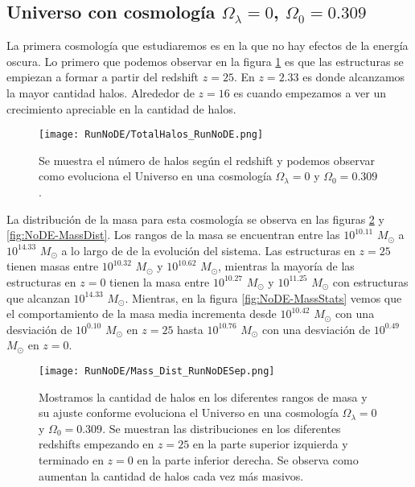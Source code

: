 
\subsection{Universo con cosmología \texorpdfstring{$\Omega_\lambda = 0$, $\Omega_0 = 0.309$ }{Omega lambda = 0, Omega 0 = 0.309}  }

La primera cosmología que estudiaremos es en la que no hay efectos de la energía oscura. Lo primero que podemos observar en la figura \ref{fig:NoDE_TotalHalos} es que las estructuras se empiezan a formar a partir del redshift $z=25$. En $z= 2.33$ es donde alcanzamos la mayor cantidad halos. Alrededor de $z = 16$ es cuando empezamos a ver un crecimiento apreciable en la cantidad de halos.

\begin{figure}[H]
    \centering
    \texttt{[image: RunNoDE/TotalHalos\_RunNoDE.png]}
    \caption[Evolución del número de halos en un Universo $\Omega_\lambda = 0$, $\Omega_0 = 0.309$]{\footnotesize Se muestra el número de halos según el redshift y podemos observar como evoluciona el Universo en una cosmología $\Omega_\lambda = 0$ y $\Omega_0 = 0.309$.}
    \label{fig:NoDE_TotalHalos}
\end{figure}

La distribución de la masa para esta cosmología se observa en las figuras \ref{fig:NoDE-MassDistSep} y \ref{fig:NoDE-MassDist}. Los rangos de la masa se encuentran entre las $10^{10.11}$ $M_\odot$ a $10^{14.33}$ $M_\odot$ a lo largo de de la evolución del sistema. Las estructuras en $z=25$ tienen masas entre $10^{10.32}$ $M_\odot$ y $10^{10.62}$ $M_\odot$, mientras la mayoría de las estructuras en $z=0$ tienen la masa entre $10^{10.27}$ $M_\odot$ y $10^{11.25}$ $M_\odot$ con estructuras que alcanzan $10^{14.33}$ $M_\odot$. Mientras, en la figura \ref{fig:NoDE-MassStats} vemos que el comportamiento de la masa media incrementa desde $10^{10.42}$ $M_\odot$ con una desviación de $10^{0.10}$ $M_\odot$ en $z=25$ hasta $10^{10.76}$ $M_\odot$ con una desviación de $10^{0.49}$ $M_\odot$ en $z=0$.

\begin{figure}[H]
    \centering
    \texttt{[image: RunNoDE/Mass\_Dist\_RunNoDESep.png]}
    \caption[Distribución de masa]{\footnotesize Mostramos la cantidad de halos en los diferentes rangos de masa y su ajuste conforme evoluciona el Universo en una cosmología $\Omega_\lambda = 0$ y $\Omega_0 = 0.309$. Se muestran las distribuciones en los diferentes redshifts empezando en $z=25$ en la parte superior izquierda y terminado en $z=0$ en la parte inferior derecha. Se observa como aumentan la cantidad de halos cada vez más masivos.}
    \label{fig:NoDE-MassDistSep}
\end{figure}

